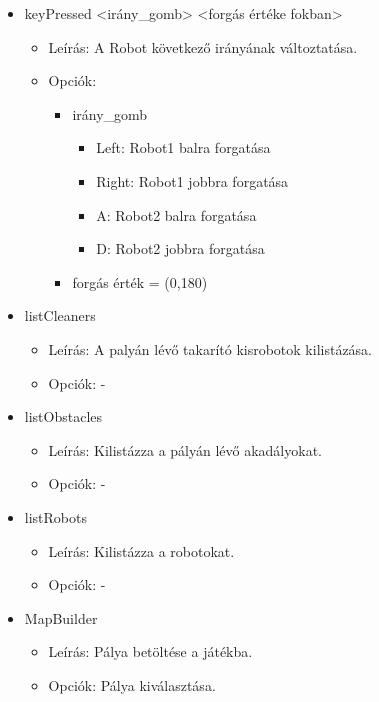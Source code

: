 \begin{itemize}
\item keyPressed <irány\_gomb> <forgás értéke fokban>
	\begin{itemize}
	\item Leírás: A Robot következő irányának változtatása.
	\item Opciók: 
    	\begin{itemize}
    	    \item irány\_gomb
        	    \begin{itemize}
        	        \item Left: Robot1 balra forgatása
        	        \item Right: Robot1 jobbra forgatása
        	        \item A: Robot2 balra forgatása
        	        \item D: Robot2 jobbra forgatása
        	    \end{itemize}
        	 \item forgás érték = (0,180)
    	\end{itemize}
	\end{itemize}
	
\item listCleaners
	\begin{itemize}
	\item Leírás: A palyán lévő takarító kisrobotok kilistázása.
	\item Opciók: -
	\end{itemize}
	
\item listObstacles
	\begin{itemize}
	\item Leírás: Kilistázza a pályán lévő akadályokat.
	\item Opciók: -
	\end{itemize}
	
\item listRobots
	\begin{itemize}
	\item Leírás: Kilistázza a robotokat.
	\item Opciók: -
	\end{itemize}
	
\item MapBuilder 
	\begin{itemize}
	\item Leírás: Pálya betöltése a játékba.
	\item Opciók: Pálya kiválasztása.
	\end{itemize}	
	

\end{itemize}
